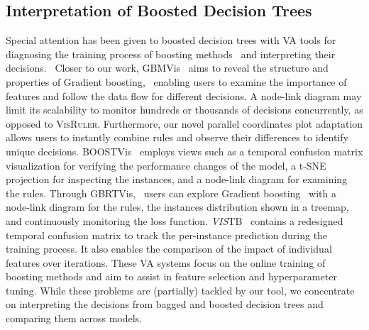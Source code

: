 
\subsection{Interpretation of Boosted Decision Trees}
Special attention has been given to boosted decision trees with VA tools for diagnosing the training process of boosting methods~\cite{Liu2018Visual,Huang2019GBRTVis,Wang2021Investigating} and interpreting their decisions.~\cite{Xia2021GBMVis} Closer to our work, GBMVis~\cite{Xia2021GBMVis} aims to reveal the structure and properties of Gradient boosting,~\cite{Friedman2001Greedy} enabling users to examine the importance of features and follow the data flow for different decisions. A node-link diagram may limit its scalability to monitor hundreds or thousands of decisions concurrently, as opposed to \textsc{VisRuler}. Furthermore, our novel parallel coordinates plot adaptation allows users to instantly combine rules and observe their differences to identify unique decisions.
%
BOOSTVis~\cite{Liu2018Visual} employs views such as a temporal confusion matrix visualization for verifying the performance changes of the model, a t-SNE~\cite{vanDerMaaten2008Visualizing} projection for inspecting the instances, and a node-link diagram for examining the rules. Through GBRTVis,~\cite{Huang2019GBRTVis} users can explore Gradient boosting~\cite{Friedman2001Greedy} with a node-link diagram for the rules, the instances distribution shown in a treemap, and continuously monitoring the loss function. \emph{VIS}TB~\cite{Wang2021Investigating} contains a redesigned temporal confusion matrix to track the per-instance prediction during the training process. It also enables the comparison of the impact of individual features over iterations. These VA systems focus on the online training of boosting methods and aim to assist in feature selection and hyperparameter tuning. While these problems are (partially) tackled by our tool, we concentrate on interpreting the decisions from bagged and boosted decision trees and comparing them across models.

